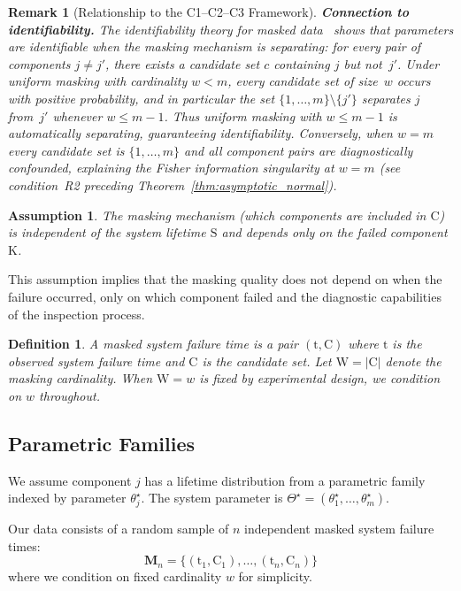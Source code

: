 \documentclass[pdflatex,sn-mathphys-num,Numbered]{sn-jnl}
\newcommand{\RV}[1]{\mathrm{#1}}
\newcommand{\sv}{\RV{S}}           %
\newcommand{\cand}{\RV{C}}         %
\newcommand{\ti}{\mathrm{t}}       %
\newcommand{\sysparam}{\Theta}
\newcommand{\tparam}[1]{{#1}^{\star}}  %
\newcommand{\mfs}{\mathbf{M}_n}
\theoremstyle{thmstyleone}
\theoremstyle{thmstylethree}
\newtheorem{definition}[theorem]{Definition}
\newtheorem{assumption}[theorem]{Assumption}
\theoremstyle{thmstyletwo}
\newtheorem{remark}[theorem]{Remark}
\begin{document}
\begin{remark}[Relationship to the C1--C2--C3 Framework]
\medskip
\noindent\textbf{Connection to identifiability.}
The identifiability theory for masked data~\cite{towell2025masked} shows that parameters are identifiable when the masking mechanism is \emph{separating}: for every pair of components $j \neq j'$, there exists a candidate set $c$ containing $j$ but not~$j'$.  Under uniform masking with cardinality $w < m$, every candidate set of size~$w$ occurs with positive probability, and in particular the set $\{1,\ldots,m\} \setminus \{j'\}$ separates $j$ from~$j'$ whenever $w \leq m-1$.  Thus uniform masking with $w \leq m-1$ is automatically separating, guaranteeing identifiability.  Conversely, when $w = m$ every candidate set is $\{1,\ldots,m\}$ and all component pairs are diagnostically confounded, explaining the Fisher information singularity at $w = m$ (see condition~R2 preceding Theorem~\ref{thm:asymptotic_normal}).
\end{remark}

\begin{assumption}
\label{asm:masking_indep}
The masking mechanism (which components are included in $\cand$) is independent of the system lifetime $\sv$ and depends only on the failed component $\RV{K}$.
\end{assumption}

This assumption implies that the masking quality does not depend on when the failure occurred, only on which component failed and the diagnostic capabilities of the inspection process.

\begin{definition}
A \emph{masked system failure time} is a pair $(\ti, \cand)$ where $\ti$ is the observed system failure time and $\cand$ is the candidate set. Let $\RV{W} = |\cand|$ denote the \emph{masking cardinality}. When $\RV{W} = w$ is fixed by experimental design, we condition on $w$ throughout.
\end{definition}

\subsection{Parametric Families}

We assume component $j$ has a lifetime distribution from a parametric family indexed by parameter $\tparam{\theta}_j$. The system parameter is $\tparam{\sysparam} = (\tparam{\theta}_1, \ldots, \tparam{\theta}_m)$.

Our data consists of a random sample of $n$ independent masked system failure times:
\begin{equation}
\mfs = \{(\ti_1, \cand_1), \ldots, (\ti_n, \cand_n)\}
\end{equation}
where we condition on fixed cardinality $w$ for simplicity.
\end{document}
